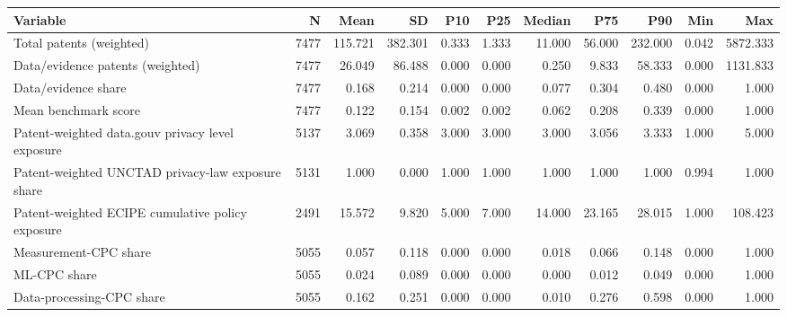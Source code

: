 \begin{tabular}{lrrrrrrrrrr}
\toprule
Variable & N & Mean & SD & P10 & P25 & Median & P75 & P90 & Min & Max \\
\midrule
Total patents (weighted) & 7477 & 115.721 & 382.301 & 0.333 & 1.333 & 11.000 & 56.000 & 232.000 & 0.042 & 5872.333 \\
Data/evidence patents (weighted) & 7477 & 26.049 & 86.488 & 0.000 & 0.000 & 0.250 & 9.833 & 58.333 & 0.000 & 1131.833 \\
Data/evidence share & 7477 & 0.168 & 0.214 & 0.000 & 0.000 & 0.077 & 0.304 & 0.480 & 0.000 & 1.000 \\
Mean benchmark score & 7477 & 0.122 & 0.154 & 0.002 & 0.002 & 0.062 & 0.208 & 0.339 & 0.000 & 1.000 \\
Patent-weighted data.gouv privacy level exposure & 5137 & 3.069 & 0.358 & 3.000 & 3.000 & 3.000 & 3.056 & 3.333 & 1.000 & 5.000 \\
Patent-weighted UNCTAD privacy-law exposure share & 5131 & 1.000 & 0.000 & 1.000 & 1.000 & 1.000 & 1.000 & 1.000 & 0.994 & 1.000 \\
Patent-weighted ECIPE cumulative policy exposure & 2491 & 15.572 & 9.820 & 5.000 & 7.000 & 14.000 & 23.165 & 28.015 & 1.000 & 108.423 \\
Measurement-CPC share & 5055 & 0.057 & 0.118 & 0.000 & 0.000 & 0.018 & 0.066 & 0.148 & 0.000 & 1.000 \\
ML-CPC share & 5055 & 0.024 & 0.089 & 0.000 & 0.000 & 0.000 & 0.012 & 0.049 & 0.000 & 1.000 \\
Data-processing-CPC share & 5055 & 0.162 & 0.251 & 0.000 & 0.000 & 0.010 & 0.276 & 0.598 & 0.000 & 1.000 \\
\bottomrule
\end{tabular}

